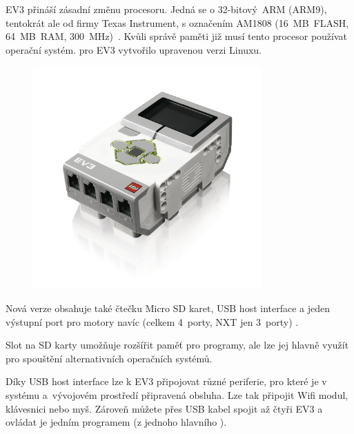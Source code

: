 EV3 přináší zásadní změnu procesoru. 
Jedná se o 32-bitový~ARM (ARM9), tentokrát ale od firmy Texas Instrument, s označením AM1808 (16~MB~FLASH, 64~MB~RAM, 300~MHz)~\cite{legoMindstormsEV3_fw-dev-kit}. 
Kvůli správě paměti již musí tento procesor používat operační systém. %
\lego{ }pro EV3 vytvořilo upravenou verzi Linuxu. 

\begin{figure}[h]
	\centering
	\includegraphics[width=330px]{images/lego-mindstorms-ev3_brick.jpg}
	\caption[]{\legoEV{ \brick}\protect\footnotemark}
	\label{fig:lego-mindstorms-ev3_brick}
\end{figure}


Nová verze obsahuje také čtečku Micro SD karet, USB host interface a jeden výstupní port pro motory navíc (celkem 4~porty, NXT jen 3~porty) \cite{legoBotBench_comparing-EV3-and-NXT}. 

Slot na SD karty umožňuje rozšířit paměť pro programy, ale lze jej hlavně využít pro spouštění alternativních operačních systémů. 

Díky USB host interface lze k EV3 připojovat různé periferie, pro které je v systému a~vývojovém prostředí připravená obsluha.
% 
% 
%
%
% 
% 
% 
% 
%
%
Lze tak připojit Wifi modul, klávesnici nebo myš. 
Zároveň můžete přes USB kabel spojit až čtyři EV3  a ovládat je jedním programem (z jednoho hlavního ).

